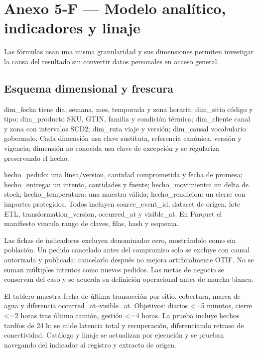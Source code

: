 \chapter*{Anexo 5-F --- Modelo analítico, indicadores y linaje}
\label{anx:5-F}
Las fórmulas usan una misma granularidad y sus dimensiones permiten investigar la causa del resultado sin convertir datos personales en acceso general.

\section*{Esquema dimensional y frescura}
dim\_fecha tiene día, semana, mes, temporada y zona horaria; dim\_sitio código y tipo; dim\_producto SKU, GTIN, familia y condición térmica; dim\_cliente canal y zona con intervalos SCD2; dim\_ruta viaje y versión; dim\_causal vocabulario gobernado. Cada dimensión usa clave sustituta, referencia canónica, versión y vigencia; dimensión no conocida usa clave de excepción y se regulariza preservando el hecho.

hecho\_pedido: una línea/version, cantidad comprometida y fecha de promesa; hecho\_entrega: un intento, cantidades y fuente; hecho\_movimiento: un delta de stock; hecho\_temperatura: una muestra válida; hecho\_rendicion: un cierre con importes protegidos. Todos incluyen source\_event\_id, dataset de origen, lote ETL, transformation\_version, occurred\_at y visible\_at. En Parquet el manifiesto vincula rango de claves, filas, hash y esquema.

Las fichas de indicadores excluyen denominador cero, mostrándolo como sin población. Un pedido cancelado antes del compromiso solo se excluye con causal autorizada y publicada; cancelarlo después no mejora artificialmente OTIF. No se suman múltiples intentos como nuevos pedidos. Las metas de negocio se conservan del caso y se acuerda su definición operacional antes de marcha blanca.

El tablero muestra fecha de última transacción por sitio, cobertura, marca de agua y diferencia occurred\_at--visible\_at. Objetivos: diarios <=5 minutos, cierre <=2 horas tras último camión, gestión <=4 horas. La prueba incluye hechos tardíos de 24 h; se mide latencia total y recuperación, diferenciando retraso de conectividad. Catálogo y linaje se actualizan por ejecución y se prueban navegando del indicador al registro y extracto de origen.

